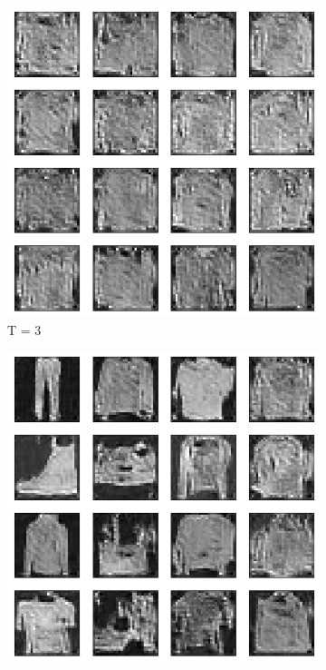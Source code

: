 \documentclass{article}
\begin{document}
\begin{figure}[H]
	\begin{subfigure}[h]{0.3\linewidth}
		\centering
		\includegraphics[scale=0.3]{../code/generated_DDGAN_wd_3.png}
		\caption{T = 3}
	\end{subfigure}
	\hfill
	\begin{subfigure}[h]{0.3\linewidth}
		\centering
		\includegraphics[scale=0.3]{../code/generated_DDGAN_wd_5.png}

\end{subfigure}
\end{figure}
\end{document}
